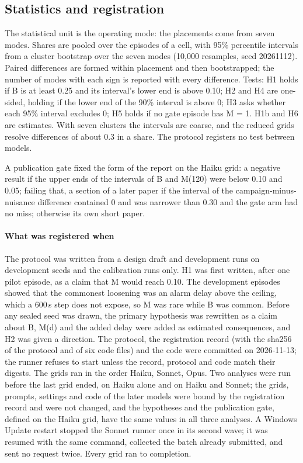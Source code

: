 \documentclass[sigconf]{acmart}
\begin{document}
\subsection{Statistics and registration}

The statistical unit is the operating mode: the placements come from seven modes. Shares are pooled over
the episodes of a cell, with 95\% percentile intervals from a cluster bootstrap over the seven modes
(10,000 resamples, seed 20261112). Paired differences are formed within placement and then
bootstrapped; the number of modes with each sign is reported with every difference. Tests: H1 holds if
B is at least 0.25 and its interval's lower end is above 0.10; H2 and H4 are one-sided, holding if the
lower end of the 90\% interval is above 0; H3 asks whether each 95\% interval excludes 0; H5 holds if no
gate episode has M = 1. H1b and H6 are estimates. With seven clusters the intervals are coarse, and the
reduced grids resolve differences of about 0.3 in a share. The protocol registers no test between
models.

A publication gate fixed the form of the report on the Haiku grid: a negative result if the upper ends of
the intervals of B and M(120) were below 0.10 and 0.05; failing that, a section of a later paper if the
interval of the campaign-minus-nuisance difference contained 0 and was narrower than 0.30 and the gate arm
had no miss; otherwise its own short paper.

\paragraph{What was registered when}
The protocol was written from a design draft and development runs on development seeds and the
calibration runs only. H1 was first written, after one pilot episode, as a claim that M would reach
0.10. The development episodes showed that the commonest loosening was an alarm delay above the ceiling,
which a 600\,s step does not expose, so M was rare while B was common. Before any sealed seed was drawn,
the primary hypothesis was rewritten as a claim about B, M(d) and the added delay were added as estimated
consequences, and H2 was given a direction. The protocol, the registration record (with the sha256 of the
protocol and of six code files) and the code were committed on 2026-11-13; the runner refuses to start
unless the record, protocol and code match their digests. The grids ran in the order Haiku, Sonnet, Opus.
Two analyses were run before the last grid ended, on Haiku alone and on Haiku and Sonnet; the grids,
prompts, settings and code of the later models were bound by the registration record and were not
changed, and the hypotheses and the publication gate, defined on the Haiku grid, have the same values in
all three analyses. A Windows Update restart stopped the Sonnet runner once in its second wave; it was
resumed with the same command, collected the batch already submitted, and sent no request twice. Every
grid ran to completion.
\end{document}
